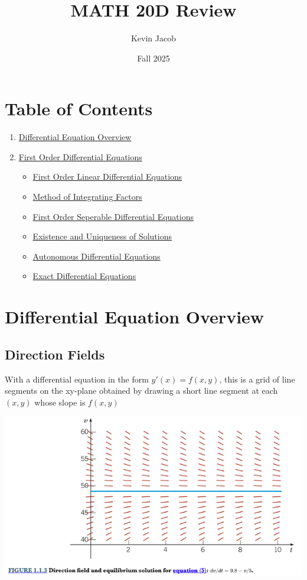 \documentclass{article}
\title{MATH 20D Review}
\author{Kevin Jacob}
\date{Fall 2025}
\begin{document}
\maketitle

\newpage

\section*{Table of Contents}
\begin{enumerate}
    \item \hyperref[sec:overview]{Differential Equation Overview}
    \item \hyperref[sec:first]{First Order Differential Equations}
    \begin{itemize}
        \item \hyperref[sec:flinear]{First Order Linear Differential Equations}
        \item \hyperref[sec:fintegratefactor]{Method of Integrating Factors}
        \item \hyperref[sec:fseperable]{First Order Seperable Differential Equations}
        \item \hyperref[sec:uniqueness]{Existence and Uniqueness of Solutions}
        \item \hyperref[sec:fautonomous]{Autonomous Differential Equations}
        \item \hyperref[sec:fexact]{Exact Differential Equations}
    \end{itemize}
\end{enumerate}
\newpage
\section{Differential Equation Overview}
\label{sec:overview}
\subsection{Direction Fields}
With a differential equation in the form $y'(x)=f(x,y)$, this is a grid of line segments on the xy-plane obtained by drawing a short line segment at each $(x,y)$ whose slope is $f(x,y)$
\begin{center}
    \includegraphics[scale=0.5]{directionField.png}
\end{center}
\end{document}
